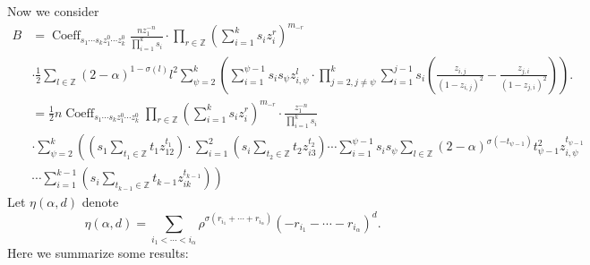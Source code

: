 \documentclass{article}
\newcommand{\lr}[1]{\left({#1}\right)}
\DeclareMathOperator{\Coeff}{Coeff}
\begin{document}
Now we consider 
\[
\begin{aligned}
B &= \Coeff_{s_1 \cdots s_{k} z_1^{0} \cdots z^0_{k} } \frac{n z_1^{-n}}{\prod_{i=1}^k s_i}\cdot\prod_{r\in\mathbb{Z}}\lr{\sum_{i=1}^k s_i z_i^r}^{m_{-r}}\\
&\cdot\frac12\sum_{l\in\mathbb{Z}}(2-\alpha)^{1-\sigma(l)}l^2\sum_{\psi=2}^k\left(\sum_{i=1}^{\psi-1}s_is_\psi z_{i,\psi}^l\cdot\prod_{j=2,j\neq\psi}^k \sum_{i=1}^{j-1} s_i \left( \frac{z_{i,j}}{(1 - z_{i,j})^2} - \frac{z_{j,i}}{(1 - z_{j,i})^2} \right)\right).\\
&= \frac12n\Coeff_{s_1 \cdots s_{k} z_1^{0} \cdots z^0_{k} }\prod_{r\in\mathbb{Z}}\lr{\sum_{i=1}^k s_i z_i^r}^{m_{-r}}\cdot\frac{z_1^{-n}}{\prod_{i=1}^k s_i}\\
&\cdot\sum_{\psi=2}^k\left(\lr{s_1\sum_{t_1\in
\mathbb{Z}}t_1z_{12}^{t_1}}\cdot\sum_{i=1}^{2}\lr{s_i\sum_{t_2\in\mathbb{Z}}t_2z_{i3}^{t_2}}\cdots
\sum_{i=1}^{\psi-1} s_is_\psi \sum_{l\in\mathbb{Z}}(2-\alpha)^{\sigma(-t_{\psi-1})}t_{\psi-1}^2z_{i,\psi}^{t_{\psi-1}}\right.\\
&\left.\cdots\sum_{i=1}^{k-1}\lr{s_i\sum_{t_{k-1}\in\mathbb{Z}}t_{k-1}z_{ik}^{t_{k-1}}}\right)
\end{aligned}
\]
Let $\eta(\alpha, d)$ denote
\[
\eta(\alpha, d) = \sum_{i_1<\cdots<i_\alpha} \rho^{\sigma(r_{i_1} + \cdots + r_{i_\alpha})}(-r_{i_1}-\cdots-r_{i_\alpha})^d.
\]
Here we summarize some results:
\end{document}
